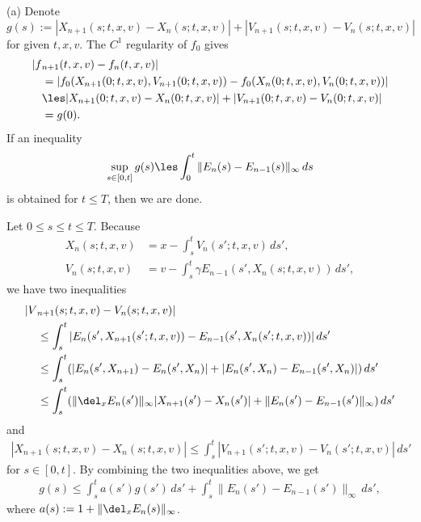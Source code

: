\documentclass[11pt]{amsart}
\begin{document}
\begin{pf}
(a)
Denote
\[g(s):=|X_{n+1}(s;t,x,v)-X_n(s;t,x,v)|+|V_{n+1}(s;t,x,v)-V_n(s;t,x,v)|\]
for given $t,x,v$.
The $C^1$ regularity of $f_0$ gives
\begin{align*}
|f&_{n+1}(t,x,v)-f_n(t,x,v)|\\
&=|f_0(X_{n+1}(0;t,x,v),V_{n+1}(0;t,x,v))-f_0(X_n(0;t,x,v),V_n(0;t,x,v))|\\
&\les|X_{n+1}(0;t,x,v)-X_n(0;t,x,v)|+|V_{n+1}(0;t,x,v)-V_n(0;t,x,v)|\\
&=g(0).
\end{align*}
If an inequality
\[\sup_{s\in[0,t]}g(s)\les\int_0^t\|E_n(s)-E_{n-1}(s)\|_\infty\,ds\]
is obtained for $t\le T$, then we are done.

Let $0\le s\le t\le T$.
Because
\begin{align*}
X_n(s;t,x,v)&=x-\int_s^tV_n(s';t,x,v)\,ds',\\
V_n(s;t,x,v)&=v-\int_s^t\gamma E_{n-1}(s',X_n(s;t,x,v))\,ds',
\end{align*}
we have two inequalities
\begin{align*}
|V&_{n+1}(s;t,x,v)-V_n(s;t,x,v)|\\
&\le\int_s^t|E_n(s',X_{n+1}(s';t,x,v))-E_{n-1}(s',X_n(s';t,x,v))|\,ds'\\
&\le\int_s^t(|E_n(s',X_{n+1})-E_n(s',X_n)|+|E_n(s',X_n)-E_{n-1}(s',X_n)|)\,ds'\\
&\le\int_s^t(\|\del_xE_n(s')\|_\infty|X_{n+1}(s')-X_n(s')|+\|E_n(s')-E_{n-1}(s')\|_\infty)\,ds'
\end{align*}
and
\begin{align*}
|X_{n+1}(s;t,x,v)-X_n(s;t,x,v)|\le\int_s^t|V_{n+1}(s';t,x,v)-V_n(s';t,x,v)|\,ds'
\end{align*}
for $s\in[0,t]$.
By combining the two inequalities above, we get
\begin{align}\label{ggw}
g(s)\le\int_s^ta(s')g(s')\,ds'+\int_s^t\|E_n(s')-E_{n-1}(s')\|_\infty\,ds',
\end{align}
where $a(s):=1+\|\del_xE_n(s)\|_\infty$.


\end{pf}
\end{document}
